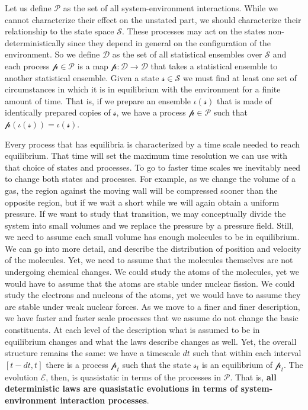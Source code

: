\documentclass[applsci,article,submit,moreauthors,pdftex]{Definitions/mdpi}
\begin{document}
Let us define $\mathcal{P}$ as the set of all system-environment interactions. While we cannot characterize their effect on the unstated part, we should characterize their relationship to the state space $\mathcal{S}$. These processes may act on the states non-deterministically since they depend in general on the configuration of the environment. So we define $\mathcal{D}$ as the set of all statistical ensembles over $\mathcal{S}$ and each process $\mathcal{p} \in \mathcal{P}$ is a map $\mathcal{p} : \mathcal{D} \to \mathcal{D}$ that takes a statistical ensemble to another statistical ensemble. Given a state $\mathcal{s} \in \mathcal{S}$ we must find at least one set of circumstances in which it is in equilibrium with the environment for a finite amount of time. That is, if we prepare an ensemble $\iota(\mathcal{s})$ that is made of identically prepared copies of $\mathcal{s}$, we have a process $\mathcal{p} \in \mathcal{P}$ such that $\mathcal{p}(\iota(\mathcal{s})) = \iota(\mathcal{s})$.

Every process that has equilibria is characterized by a time scale needed to reach equilibrium. That time will set the maximum time resolution we can use with that choice of states and processes. To go to faster time scales we inevitably need to change both states and processes. For example, as we change the volume of a gas, the region against the moving wall will be compressed sooner than the opposite region, but if we wait a short while we will again obtain a uniform pressure. If we want to study that transition, we may conceptually divide the system into small volumes and we replace the pressure by a pressure field. Still, we need to assume each small volume has enough molecules to be in equilibrium. We can go into more detail, and describe the distribution of position and velocity of the molecules. Yet, we need to assume that the molecules themselves are not undergoing chemical changes. We could study the atoms of the molecules, yet we would have to assume that the atoms are stable under nuclear fission. We could study the electrons and nucleons of the atoms, yet we would have to assume they are stable under weak nuclear forces. As we move to a finer and finer description, we have faster and faster scale processes that we assume do not change the basic constituents. At each level of the description what is assumed to be in equilibrium changes and what the laws describe changes as well. Yet, the overall structure remains the same: we have a timescale $dt$ such that within each interval $[t-dt, t]$ there is a process $\mathcal{p}_t$ such that the state $\mathcal{s}_t$ is an equilibrium of $\mathcal{p}_t$. The evolution $\mathcal{E}$, then, is quasistatic in terms of the processes in $\mathcal{P}$. That is, \textbf{all deterministic laws are quasistatic evolutions in terms of system-environment interaction processes}.
\end{document}
